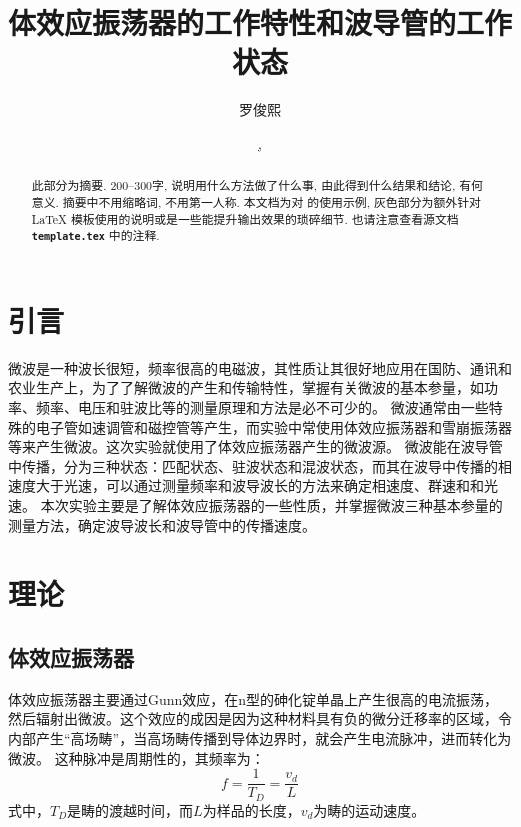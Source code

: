\documentclass[font=fandol]{mpltx}
\makeatletter
\newcommand{\note}[1]{{\color{gray}#1}}
\newcommand*\file[1]{\textbf{\texttt{#1}}}
\newcommand\releasedate{%
    \href{https://github.com/CastleStar14654/PKUMpLtX/releases/tag/\mpltx@fileversion}%
        {\mpltx@filedate, \mpltx@fileversion}}
\makeatother
\begin{document}
\title{体效应振荡器的工作特性和波导管的工作状态} %
\author{罗俊熙} %
\date{\releasedate}
\begin{abstract}
	此部分为摘要.
	200--300字, 说明用什么方法做了什么事, 由此得到什么结果和结论, 有何意义.
	摘要中不用缩略词, 不用第一人称.
	\note{本文档为对 \href{https://github.com/CastleStar14654/PKUMpLtX}{\pkg*{PKUMpLtX}} 的使用示例, 灰色部分为额外针对 \LaTeX{} 模板使用的说明或是一些能提升输出效果的琐碎细节.
		也请注意查看源文档 \file{template.tex} 中的注释.}
\end{abstract}

\maketitle

\section{引言}
微波是一种波长很短，频率很高的电磁波，其性质让其很好地应用在国防、通讯和农业生产上，为了了解微波的产生和传输特性，掌握有关微波的基本参量，如功率、频率、电压和驻波比等的测量原理和方法是必不可少的。
微波通常由一些特殊的电子管如速调管和磁控管等产生，而实验中常使用体效应振荡器和雪崩振荡器等来产生微波。这次实验就使用了体效应振荡器产生的微波源。
微波能在波导管中传播，分为三种状态：匹配状态、驻波状态和混波状态，而其在波导中传播的相速度大于光速，可以通过测量频率和波导波长的方法来确定相速度、群速和和光速。
本次实验主要是了解体效应振荡器的一些性质，并掌握微波三种基本参量的测量方法，确定波导波长和波导管中的传播速度。

\section{理论}\label{sec:theory}
\subsection{体效应振荡器}
体效应振荡器主要通过Gunn效应，在n型的砷化锭单晶上产生很高的电流振荡，然后辐射出微波。这个效应的成因是因为这种材料具有负的微分迁移率的区域，令内部产生“高场畴”，当高场畴传播到导体边界时，就会产生电流脉冲，进而转化为微波。
这种脉冲是周期性的，其频率为：
$$f=\frac{1}{T_D}=\frac{v_d}{L}$$
式中，$T_D$是畴的渡越时间，而$L$为样品的长度，$v_d$为畴的运动速度。
\end{document}
